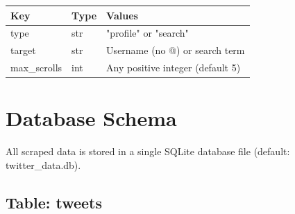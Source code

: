 \documentclass[11pt, a4paper]{article}
\def\pytype#1{#1}%
\def\texttt#1{#1}%
\def\color#1{}%
\newcommand{\pytype}[1]{\texttt{\color{TwGray}#1}}
\begin{document}
\begin{center}
\begin{tabular}{lll}
\toprule
\textbf{Key}         & \textbf{Type}  & \textbf{Values} \\
\midrule
\texttt{type}        & \pytype{str}   & \texttt{"profile"} or \texttt{"search"} \\
\texttt{target}      & \pytype{str}   & Username (no \texttt{@}) or search term \\
\texttt{max\_scrolls} & \pytype{int}  & Any positive integer (default \texttt{5}) \\
\bottomrule
\end{tabular}
\end{center}

\section{Database Schema}

All scraped data is stored in a single SQLite database file
(default: \texttt{twitter\_data.db}).

\subsection{Table: \texttt{tweets}}
\end{document}

